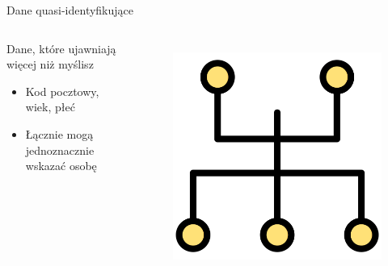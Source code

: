  
  \begin{frame}{Dane quasi-identyfikujące}
  \begin{columns}[c]
      \begin{alertblock}{Dane, które ujawniają więcej niż myślisz}
        \begin{itemize}
          \item Kod pocztowy, wiek, płeć
          \item Łącznie mogą jednoznacznie wskazać osobę
        \end{itemize}
      \end{alertblock}
      \begin{figure}
        \centering
        \includegraphics[height=0.45\textheight]{images/network-topology.png}
        \label{fig:quasiIdentifiers}
      \end{figure}
  \end{columns}
  \end{frame}
  
